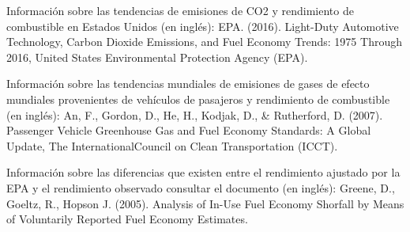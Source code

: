 \documentclass{article}
\begin{document}



Información sobre las tendencias de emisiones de CO2 y rendimiento de combustible en Estados Unidos (en inglés):
EPA. (2016). Light-Duty Automotive Technology, Carbon Dioxide Emissions, and Fuel Economy Trends: 1975 Through 2016, United States Environmental Protection Agency (EPA).

Información sobre las tendencias mundiales de emisiones de gases de efecto mundiales provenientes de vehículos de pasajeros y rendimiento de combustible (en inglés):
An, F., Gordon, D., He, H., Kodjak, D., \& Rutherford, D. (2007). Passenger Vehicle Greenhouse Gas and Fuel Economy Standards: A Global Update, The InternationalCouncil on Clean Transportation (ICCT).

Información sobre las diferencias que existen entre el rendimiento ajustado por la EPA y el rendimiento observado consultar el documento (en inglés):
Greene, D., Goeltz, R., Hopson J. (2005). Analysis of In-Use Fuel Economy Shorfall by Means of Voluntarily Reported Fuel Economy Estimates.
\end{document}
